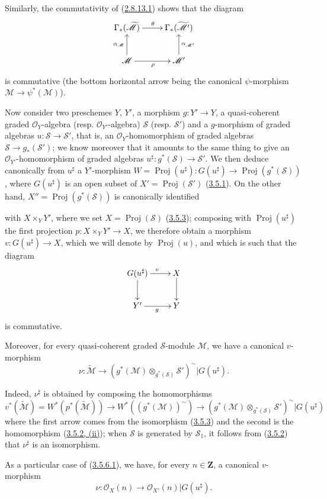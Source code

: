 \begin{env}[3.5.5]
Similarly, the commutativity of
(\hyperref[II.2.8.13.1]{2.8.13.1}) shows that the diagram
\[
  \xymatrix{
    \Gamma_*(\widetilde{\mathcal{M}})\ar[r]^{\theta}
    & \Gamma_*(\widetilde{\mathcal{M}'})\\
    \mathcal{M}\ar[r]_{\rho}\ar[u]^{\alpha_{\mathcal{M}}}
    & \mathcal{M}'\ar[u]_{\alpha_{\mathcal{M}'}}
  }
\]
is commutative (the bottom horizontal arrow being the canonical
$\psi$-morphism $\mathcal{M}\to\psi^*(\mathcal{M})$).
\end{env}

\begin{env}[3.5.6]
\label{II.3.5.6}
Now consider two preschemes $Y$, $Y'$, a morphism
$g:Y'\to Y$, a quasi-coherent graded $\mathcal{O}_Y$-algebra (resp.
$\mathcal{O}_{Y'}$-algebra) $\mathcal{S}$ (resp.
$\mathcal{S}'$) and a $g$-morphism of graded algebras
$u:\mathcal{S}\to\mathcal{S}'$, that is, an
$\mathcal{O}_Y$-homomorphism of graded algebras
$\mathcal{S}\to g_*(\mathcal{S}')$; we know moreover that it amounts to the
same thing to give an $\mathcal{O}_{Y'}$-homomorphism of graded algebras
$u^\sharp:g^*(\mathcal{S})\to\mathcal{S}'$. We then deduce canonically from
$u^\sharp$ a $Y'$-morphism
$W=\operatorname{Proj}(u^\sharp):G(u^\sharp)\to
\operatorname{Proj}(g^*(\mathcal{S}))$, where $G(u^\sharp)$ is an open subset
of $X'=\operatorname{Proj}(\mathcal{S}')$
(\hyperref[II.3.5.1]{3.5.1}). On the other hand,
$X''=\operatorname{Proj}(g^*(\mathcal{S}))$ is canonically identified


with $X\times_Y Y'$, where we set
$X=\operatorname{Proj}(\mathcal{S})$
(\hyperref[II.3.5.3]{3.5.3}); composing with
$\operatorname{Proj}(u^\sharp)$ the first projection
$p:X\times_Y Y'\to X$, we therefore obtain a morphism
$v:G(u^\sharp)\to X$, which we will denote by $\operatorname{Proj}(u)$, and
which is such that the diagram
\[
  \xymatrix{
    G(u^\sharp)\ar[r]^{v}\ar[d]
    & X\ar[d]\\
    Y'\ar[r]_{g}
    & Y
  }
\]
is commutative.

Moreover, for every quasi-coherent graded $\mathcal{S}$-module $\mathcal{M}$,
we have a canonical $v$-morphism
\[
\label{II.3.5.6.1}
  \nu:\widetilde{\mathcal{M}}\longrightarrow
  (g^*(\mathcal{M})\otimes_{g^*(\mathcal{S})}\mathcal{S}')^{\sim}
  |G(u^\sharp).
\tag{3.5.6.1}
\]

Indeed, $\nu^\sharp$ is obtained by composing the homomorphisms
\[
  v^*(\widetilde{\mathcal{M}})
  =W^*(p^*(\widetilde{\mathcal{M}}))
  \longrightarrow W^*((g^*(\mathcal{M}))^{\sim})
  \longrightarrow
  (g^*(\mathcal{M})\otimes_{g^*(\mathcal{S})}\mathcal{S}')^{\sim}
  |G(u^\sharp)
\]
where the first arrow comes from the isomorphism
(\hyperref[II.3.5.3]{3.5.3}) and the second is the homomorphism
(\hyperref[II.3.5.2]{3.5.2, (ii)}); when $\mathcal{S}$ is generated
by $\mathcal{S}_1$, it follows from (\hyperref[II.3.5.2]{3.5.2}) that
$\nu^\sharp$ is an isomorphism.

As a particular case of (\hyperref[II.3.5.6.1]{3.5.6.1}), we have, for
every $n\in\mathbf{Z}$, a canonical $v$-morphism
\[
\label{II.3.5.6.2}
  \nu:\mathcal{O}_X(n)\longrightarrow
  \mathcal{O}_{X'}(n)|G(u^\sharp).
\tag{3.5.6.2}
\]
\end{env}

